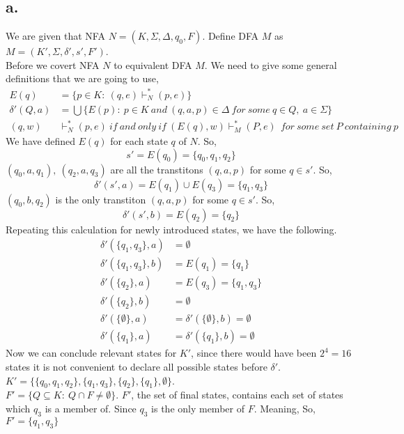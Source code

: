 \documentclass[12pt]{article}
\begin{document}
\subsection*{a.}

We are given that NFA $N=(K,\Sigma,\Delta,q_0,F)$. Define DFA $M$ as $M=(K',\Sigma,\delta ',s',F')$. \\
Before we covert NFA $N$ to equivalent DFA $M$. We need to give some general definitions that we are going to use,
\begin{equation} 
\begin{split}
E(q) & = \{ p\in K:\ (q,e)\vdash _N^*(p,e)\} \\
\delta '(Q,a) & = \bigcup \{ E(p):\ p\in K\ and\ (q,a,p)\in \Delta\ for\ some\ q\in Q,\ a\in \Sigma \} \\
(q,w)& \vdash_N^*(p,e)\ if\ and\ only\ if\ (E(q),w)\vdash _M^*(P,e)\ \ for\ some\ set\ P\ containing\ p
\end{split}
\end{equation} 
We have defined $E(q)$ for each state $q$ of $N$. So, $$s'=E(q_0)=\{q_0,q_1,q_2\}$$
\quad \qquad \qquad \qquad $(q_0,a,q_1),\ (q_2,a,q_3)$ are all the transtitons $(q,a,p)$ for some $q\in s'$. So, 
$$\delta '(s',a)=E(q_1)\cup E(q_3)=\{q_1,q_3\}$$
\quad \qquad \qquad \qquad $(q_0,b,q_2)$ is the only transtiton $(q,a,p)$ for some $q\in s'$. So, 
$$\delta '(s',b)=E(q_2)=\{q_2\}$$
Repeating this calculation for newly introduced states, we have the following.
\begin{equation} 
\begin{split}
\delta '(\{q_1,q_3\},a) & = \emptyset \\
\delta '(\{q_1,q_3\},b) & = E(q_1) = \{q_1\} \\
\delta '(\{q_2\},a) & = E(q_3) =  \{q_1,q_3\} \\
\delta '(\{q_2\},b) & = \emptyset \\
\delta '(\{ \emptyset \},a) & = \delta '(\{ \emptyset \},b) = \emptyset \\
\delta '(\{q_1\},a) & = \delta '(\{q_1\},b) = \emptyset 
\end{split}
\end{equation} 
Now we can conclude relevant states for $K'$, since there would have been $2^4=16$ states it is not convenient to declare all possible states before $\delta '$. $K'=\{ \{q_0,q_1,q_2\}, \{q_1,q_3\}, \{q_2 \}, \{q_1\}, \emptyset \}$. \\
$F'=\{Q\subseteq K:\ Q\cap F \neq \emptyset \}$. $F'$, the set of final states, contains each set of states which $q_3$ is a member of. Since $q_3$ is the only member of $F$. Meaning, So, $F'=\{q_1,q_3\}$ \\
\end{document}
